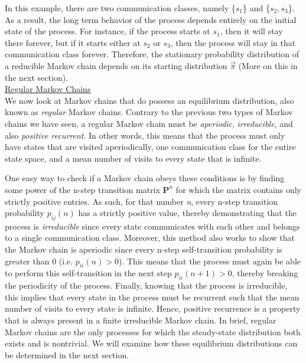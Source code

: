 \documentclass[a4paper, 12pt]{article}
\begin{document}
In this example, there are two communication classes, namely \{$s_1$\} and \{$s_2,s_3$\}. As a result, the long term behavior of the process depends entirely on the initial state of the process. For instance, if the process starts at $s_1$, then it will stay there forever, but if it starts either at $s_2$ or $s_3$, then the process will stay in that communication class forever. Therefore, the stationary probability distribution of a reducible Markov chain depends on its starting distribution $\vec{\pi}$ (More on this in the next section). \\ 

\underline{Regular Markov Chains}\\

	We now look at Markov chains that do possess an equilibrium distribution, also known as \textit{regular} Markov chains. Contrary to the previous two types of Markov chains we have seen, a regular Markov chain must be \textit{aperiodic}, \textit{irreducible}, and also \textit{positive recurrent}. In other words, this means that the process must only have states that are visited aperiodically, one communication class for the entire state space, and a mean number of visits to every state that is infinite.
	
	 One easy way to check if a Markov chain obeys these conditions is by finding some power of the n-step transition matrix $\textbf{P}^n$ for which the matrix contains only strictly positive entries. As such, for that number \textit{n}, every n-step transition probability $p_{ij}(n)$ has a strictly positive value, thereby demonstrating that the process is \textit{irreducible} since every state communicates with each other and belongs to a single communication class.  Moreover, this method also works to show that the Markov chain is aperiodic since every n-step self-transition probability is greater than 0 (i.e. $p_{ii}(n) > 0$).  This means that the process must again be able to perform this self-transition in the next step $p_{ii}(n+1) > 0$, thereby breaking the periodicity of the process. Finally, knowing that the process is irreducible, this implies that every state in the process must be recurrent such that the mean number of visits to every state is infinite. Hence, positive recurrence is a property that is always present in a finite irreducible Markov chain. 
	 In brief, regular Markov chains are the only processes for which the steady-state distribution both exists and is nontrivial. We will examine how these equilibrium distributions can be determined in the next section.
	
\end{document}
